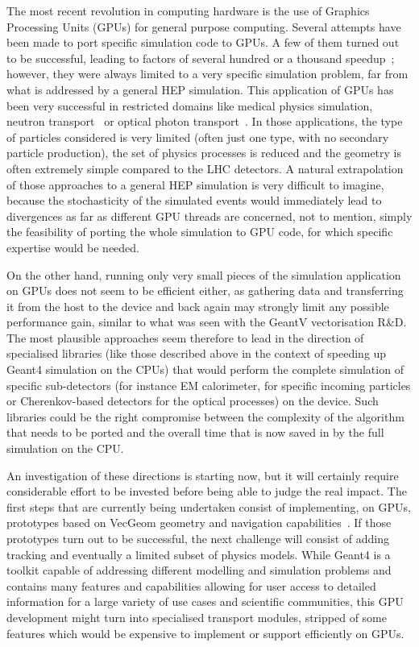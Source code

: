 The most recent revolution in computing hardware is the
use of Graphics Processing Units (GPUs) for general purpose computing. Several
attempts have been made to port specific simulation code to GPUs. A few
of them turned out to be successful, leading to factors of several
hundred or a thousand speedup~\cite{GPU-MPEXS-DNA, Hybrid-Gate, Opticks}; however, they were always
limited to a very specific simulation problem, far from what is
addressed by a general HEP simulation. This application of GPUs has been
very successful in restricted domains like medical physics simulation,
neutron transport~\cite{SHIFT01} or optical photon transport~\cite{CHEP-Juno}. 
In those applications, the type of particles considered
is very limited (often just one type, with no secondary particle
production), the set of physics processes is reduced and the geometry is
often extremely simple compared to the LHC detectors. A natural
extrapolation of those approaches to a general HEP simulation is very
difficult to imagine, because the stochasticity of the simulated events
would immediately lead to divergences as far as different GPU threads
are concerned, not to mention, simply the feasibility of porting the
whole simulation to GPU code, for which specific expertise would be
needed. 

On the other hand, running only very small pieces of the
simulation application on GPUs does not seem to be efficient either, as
gathering data and transferring it from the host to the device and back again
may strongly limit any possible performance gain, similar to what was
seen with the GeantV vectorisation R\&D. The most plausible approaches
seem therefore to lead in the direction of specialised libraries (like
those described above in the context of speeding up Geant4 simulation on
the CPUs) that would perform the complete simulation of specific
sub-detectors (for instance EM calorimeter, for specific incoming
particles or Cherenkov-based detectors for the optical processes) on the
device. Such libraries could be the right compromise between the
complexity of the algorithm that needs to be ported and
the overall time that is now saved in
by the full simulation on the CPU.

An investigation of
these directions is starting now, but it will certainly require
considerable effort to be invested before being able to judge
the real impact. The first steps that are currently being undertaken
consist of implementing, on GPUs, prototypes based on VecGeom geometry
and navigation capabilities~\cite{Wenzel_2017}. If those prototypes turn out to be
successful, the next challenge will consist of adding tracking and
eventually a limited subset of physics models. While Geant4 is a toolkit
capable of addressing different modelling and simulation problems and
contains many features and capabilities allowing for user access to
detailed information for a large variety of use cases and scientific
communities, this GPU development might turn into specialised transport
modules, stripped of some features which would be expensive to implement
or support efficiently on GPUs.

